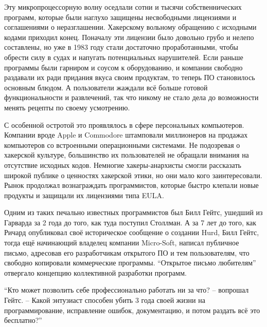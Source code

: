 Эту микропроцессорную волну оседлали сотни и тысячи собственнических программ, которые были наглухо защищены несвободными лицензиями и соглашениями о неразглашении. Хакерскому вольному обращению с исходными кодами приходил конец. Поначалу эти лицензии было довольно грубо и нелепо составлены, но уже в 1983 году стали достаточно проработанными, чтобы обрести силу в судах и напугать потенциальных нарушителей. Если раньше программы были гарниром и соусом к оборудованию, и компании свободно раздавали их ради придания вкуса своим продуктам, то теперь ПО становилось основным блюдом. А пользователи жаждали всё больше готовой функциональности и развлечений, так что никому не стало дела до возможности менять рецепты по своему усмотрению.

С особенной остротой это проявлялось в сфере персональных компьютеров. Компании вроде Apple и Commodore штамповали миллионеров на продажах компьютеров со встроенными операционными системами. Не подозревая о хакерской культуре, большинство их пользователей не обращали внимания на отсутствие исходных кодов. Немногие хакеры-анархисты смогли рассказать широкой публике о ценностях хакерской этики, но они мало кого заинтересовали. Рынок продолжал вознаграждать программистов, которые быстро клепали новые продукты и защищали их лицензиями типа EULA.

Одним из таких печально известных программистов был Билл Гейтс, ушедший из Гарварда за 2 года до того, как туда поступил Столлман. А за 7 лет до того, как Ричард опубликовал своё историческое сообщение о создании Hurd, Билл Гейтс, тогда ещё начинающий владелец компании Micro-Soft, написал публичное письмо, адресовав его разработчикам открытого ПО и тем пользователям, что свободно копировали коммерческие программы. \enquote{Открытое письмо любителям} отвергало концепцию коллективной разработки программ.

\enquote{Кто может позволить себе профессионально работать ни за что? -- вопрошал Гейтс. -- Какой энтузиаст способен убить 3 года своей жизни на программирование, исправление ошибок, документацию, и потом раздать всё это бесплатно?}

